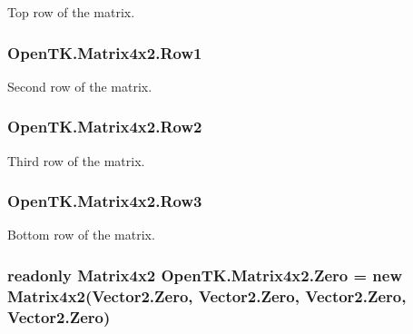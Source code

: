 Top row of the matrix. 

\hypertarget{struct_open_t_k_1_1_matrix4x2_a6646ce8b78c6e5d2e9b9bc350e2c7a6f}{
\subsubsection[{Row1}]{ Open\-T\-K.\-Matrix4x2.\-Row1}}\label{struct_open_t_k_1_1_matrix4x2_a6646ce8b78c6e5d2e9b9bc350e2c7a6f}


Second row of the matrix. 

\hypertarget{struct_open_t_k_1_1_matrix4x2_ac5b2e729263edbd5dac2f2fe35f230b7}{
\subsubsection[{Row2}]{ Open\-T\-K.\-Matrix4x2.\-Row2}}\label{struct_open_t_k_1_1_matrix4x2_ac5b2e729263edbd5dac2f2fe35f230b7}


Third row of the matrix. 

\hypertarget{struct_open_t_k_1_1_matrix4x2_ae65b8f3e6f77574480ca2105ce162aa6}{
\subsubsection[{Row3}]{ Open\-T\-K.\-Matrix4x2.\-Row3}}\label{struct_open_t_k_1_1_matrix4x2_ae65b8f3e6f77574480ca2105ce162aa6}


Bottom row of the matrix. 

\hypertarget{struct_open_t_k_1_1_matrix4x2_a13379b481a9b39b14d60e28ee70ee67f}{
\subsubsection[{Zero}]{\setlength{\rightskip}{0pt plus 5cm}readonly {\bf Matrix4x2} Open\-T\-K.\-Matrix4x2.\-Zero = new {\bf Matrix4x2}(Vector2.\-Zero, Vector2.\-Zero, Vector2.\-Zero, Vector2.\-Zero)\hspace{0.3cm}{\ttfamily [static]}}}\label{struct_open_t_k_1_1_matrix4x2_a13379b481a9b39b14d60e28ee70ee67f}



